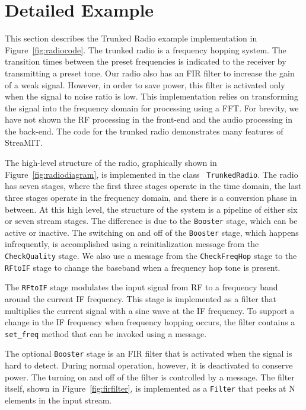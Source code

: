 \section{Detailed Example}
\label{sec:example}
This section describes the Trunked Radio example implementation in
Figure~\ref{fig:radiocode}. The trunked radio is a frequency hopping
system. The transition times between the preset frequencies is
indicated to the receiver by transmitting a preset tone.  Our radio
also has an FIR filter to increase the gain of a weak signal. However,
in order to save power, this filter is activated only when the signal
to noise ratio is low.  This implementation relies on transforming the
signal into the frequency domain for processing using a FFT. For
brevity, we have not shown the RF processing in the front-end and the
audio processing in the back-end.  The code for the trunked radio
demonstrates many features of StreaMIT.

The high-level structure of the radio, graphically shown in
Figure~\ref{fig:radiodiagram}, is implemented in the class {\tt
TrunkedRadio}. The radio has seven stages, where the first three
stages operate in the time domain, the last three stages operate in
the frequency domain, and there is a conversion phase in between.  At
this high level, the structure of the system is a pipeline of either
six or seven stream stages. The difference is due to the {\tt Booster}
stage, which can be active or inactive. The switching on and off of
the {\tt Booster} stage, which happens infrequently, is accomplished
using a reinitialization message from the {\tt CheckQuality} stage. We
also use a message from the {\tt CheckFreqHop} stage to the {\tt
RFtoIF} stage to change the baseband when a frequency hop tone is
present.

The {\tt RFtoIF} stage modulates the input signal from RF to a
frequency band around the current IF frequency. This stage is
implemented as a filter that multiplies the current signal with a sine
wave at the IF frequency.  To support a change in the IF frequency
when frequency hopping occurs, the filter contains a {\tt set\_freq}
method that can be invoked using a message.

The optional {\tt Booster} stage is an FIR filter that is activated
when the signal is hard to detect. During normal operation, however,
it is deactivated to conserve power. The turning on and off of the
filter is controlled by a message.  The filter itself, shown in
Figure~\ref{fig:firfilter}, is implemented as a {\tt Filter} that
peeks at N elements in the input stream.

